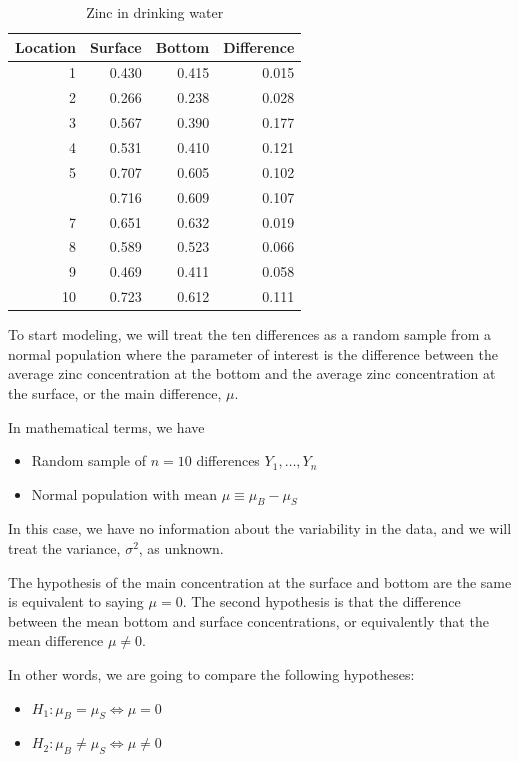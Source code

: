 \documentclass[]{book}
\providecommand{\tightlist}{%
  \setlength{\itemsep}{0pt}\setlength{\parskip}{0pt}}
\theoremstyle{definition}
\theoremstyle{definition}
\theoremstyle{definition}
\theoremstyle{remark}
\begin{document}
\begin{table}

\caption{\label{tab:zinc-table}Zinc in drinking water}
\centering
\begin{tabular}[t]{rrrr}
\toprule
Location & Surface & Bottom & Difference\\
\midrule
1 & 0.430 & 0.415 & 0.015\\
2 & 0.266 & 0.238 & 0.028\\
3 & 0.567 & 0.390 & 0.177\\
4 & 0.531 & 0.410 & 0.121\\
5 & 0.707 & 0.605 & 0.102\\
\addlinespace
6 & 0.716 & 0.609 & 0.107\\
7 & 0.651 & 0.632 & 0.019\\
8 & 0.589 & 0.523 & 0.066\\
9 & 0.469 & 0.411 & 0.058\\
10 & 0.723 & 0.612 & 0.111\\
\bottomrule
\end{tabular}
\end{table}

To start modeling, we will treat the ten differences as a random sample
from a normal population where the parameter of interest is the
difference between the average zinc concentration at the bottom and the
average zinc concentration at the surface, or the main difference,
\(\mu\).

In mathematical terms, we have

\begin{itemize}
\tightlist
\item
  Random sample of \(n= 10\) differences \(Y_1, \ldots, Y_n\)
\item
  Normal population with mean \(\mu \equiv \mu_B - \mu_S\)
\end{itemize}

In this case, we have no information about the variability in the data,
and we will treat the variance, \(\sigma^2\), as unknown.

The hypothesis of the main concentration at the surface and bottom are
the same is equivalent to saying \(\mu = 0\). The second hypothesis is
that the difference between the mean bottom and surface concentrations,
or equivalently that the mean difference \(\mu \neq 0\).

In other words, we are going to compare the following hypotheses:

\begin{itemize}
\tightlist
\item
  \(H_1: \mu_B = \mu_S \Leftrightarrow \mu = 0\)
\item
  \(H_2: \mu_B \neq \mu_S \Leftrightarrow \mu \neq 0\)
\end{itemize}
\end{document}
